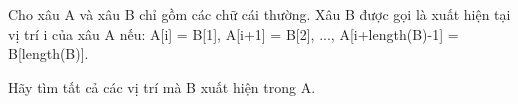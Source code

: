 Cho xâu A và xâu B chỉ gồm các chữ cái thường. Xâu B được gọi là xuất hiện tại vị trí i của xâu A nếu: A[i] = B[1], A[i+1] = B[2], ..., A[i+length(B)-1] = B[length(B)].

Hãy tìm tất cả các vị trí mà B xuất hiện trong A.